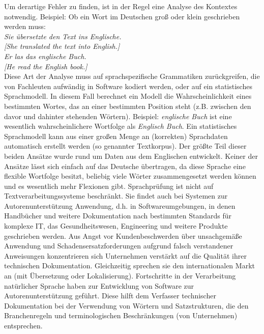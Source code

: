 \documentclass[]{../../metanetpaper}
\begin{document}
\begin{Parallel}[c]{80mm}{80mm}
{Um derartige Fehler zu finden, ist in der Regel eine Analyse des Kontextes notwendig. Beispiel: Ob ein Wort im Deutschen groß oder klein geschrieben werden muss:\\
\textit{Sie übersetzte den Text ins Englische.}\\
\textit{ {[}She translated the text into English.{]} }\\
\textit {Er las das englische Buch.}\\
\textit{ {[}He read the English book.{]} }\\
Diese Art der Analyse muss auf sprachspezifische Grammatiken zurückgreifen, die von Fachleuten aufwändig in Software kodiert werden, oder auf ein statistisches Sprachmodell. In diesem Fall berechnet ein Modell die Wahrscheinlichkeit eines bestimmten Wortes, das an einer bestimmten Position steht (z.B. zwischen den davor und dahinter stehenden Wörtern). Beispiel: \textit{englische Buch} ist eine wesentlich wahrscheinlichere Wortfolge als \textit{Englisch Buch}. Ein statistisches Sprachmodell kann aus einer großen Menge an (korrekten) Sprachdaten automatisch erstellt werden (so genannter Textkorpus). Der größte Teil dieser beiden Ansätze wurde rund um Daten aus dem Englischen entwickelt. Keiner der Ansätze lässt sich einfach auf das Deutsche übertragen, da diese Sprache eine flexible Wortfolge besitzt, beliebig viele Wörter zusammengesetzt werden können und es wesentlich mehr Flexionen gibt. 
Sprachprüfung ist nicht auf Textverarbeitungssysteme beschränkt. Sie findet auch bei Systemen zur Autorenunterstützung Anwendung, d.h. in Softwareumgebungen, in denen Handbücher und weitere Dokumentation nach bestimmten Standards für komplexe IT, das Gesundheitswesen, Engineering und weitere Produkte geschrieben werden. Aus Angst vor Kundenbeschwerden über unsachgemäße Anwendung und Schadensersatzforderungen aufgrund falsch verstandener Anweisungen konzentrieren sich Unternehmen verstärkt auf die Qualität ihrer technischen Dokumentation. Gleichzeitig sprechen sie den internationalen Markt an (mit Übersetzung oder Lokalisierung). Fortschritte in der Verarbeitung natürlicher Sprache haben zur Entwicklung von Software zur Autorenunterstützung geführt. Diese hilft dem Verfasser technischer Dokumentation bei der Verwendung von Wörtern und Satzstrukturen, die den Branchenregeln und terminologischen Beschränkungen (von Unternehmen) entsprechen.

}
\end{Parallel}
\end{document}
